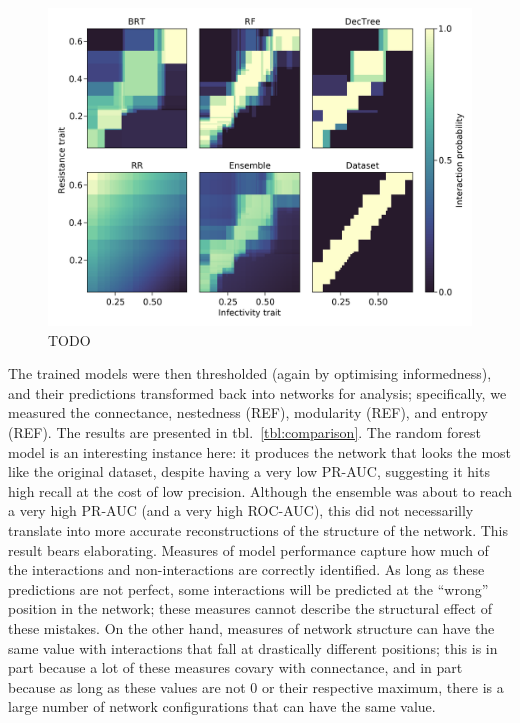 \documentclass[11pt]{article}
\makeatletter
\def\maxwidth{\ifdim\Gin@nat@width>\linewidth\linewidth
\else\Gin@nat@width\fi}
\let\Oldincludegraphics\includegraphics
\renewcommand{\includegraphics}[1]{\Oldincludegraphics[width=\maxwidth]{#1}}
\makeatother
\begin{document}
\begin{figure}
\hypertarget{fig:ecovalid}{%
\centering
\includegraphics{figures/valid_ensemble.png}
\caption{TODO}\label{fig:ecovalid}
}
\end{figure}

The trained models were then thresholded (again by optimising
informedness), and their predictions transformed back into networks for
analysis; specifically, we measured the connectance, nestedness (REF),
modularity (REF), and entropy (REF). The results are presented in
tbl.~\ref{tbl:comparison}. The random forest model is an interesting
instance here: it produces the network that looks the most like the
original dataset, despite having a very low PR-AUC, suggesting it hits
high recall at the cost of low precision. Although the ensemble was
about to reach a very high PR-AUC (and a very high ROC-AUC), this did
not necessarilly translate into more accurate reconstructions of the
structure of the network. This result bears elaborating. Measures of
model performance capture how much of the interactions and
non-interactions are correctly identified. As long as these predictions
are not perfect, some interactions will be predicted at the ``wrong''
position in the network; these measures cannot describe the structural
effect of these mistakes. On the other hand, measures of network
structure can have the same value with interactions that fall at
drastically different positions; this is in part because a lot of these
measures covary with connectance, and in part because as long as these
values are not 0 or their respective maximum, there is a large number of
network configurations that can have the same value.
\end{document}
